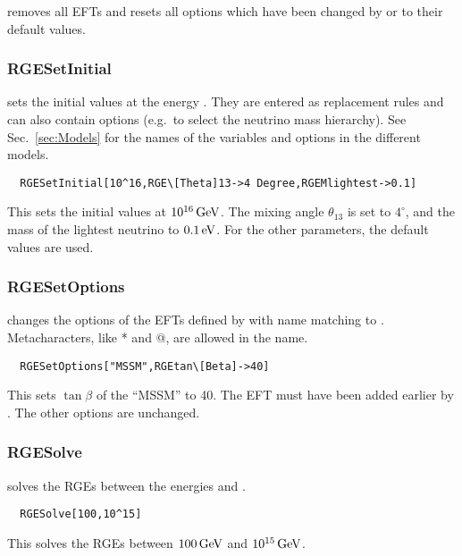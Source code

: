 \documentclass[10pt,a4paper,twoside]{scrartcl}
\begin{document}
 removes all EFTs and resets all options which have
been changed by  or 
to their default values. 

\subsubsection{RGESetInitial}

 sets
the initial values at the energy .  They are entered as
replacement rules and can also contain options (e.g.\ to select the
neutrino mass hierarchy).  See Sec.~\ref{sec:Models} for the names of
the variables and options in the different models.

\begin{verbatim}
  RGESetInitial[10^16,RGE\[Theta]13->4 Degree,RGEMlightest->0.1]
\end{verbatim}
This sets the initial values at $10^{16}\,\mathrm{GeV}$.  The mixing angle
$\theta_{13}$ is set to $4^\circ$, and the mass of the lightest neutrino
to $0.1\,\mathrm{eV}$.  For the other parameters, the default values are used.



\subsubsection{RGESetOptions}

 changes the options
of the EFTs defined by  with name matching  to . Metacharacters, like * and @, are
allowed in the name.

\begin{verbatim}
  RGESetOptions["MSSM",RGEtan\[Beta]->40]
\end{verbatim}
This sets $\tan\beta$ of the ``MSSM'' to 40.  The EFT must have been
added earlier by .  The other options are
unchanged.



\subsubsection{RGESolve}

 solves
the RGEs between the energies  and . 

\begin{verbatim}
  RGESolve[100,10^15]
\end{verbatim}
This solves the RGEs between $100\,\mathrm{GeV}$ and $10^{15}\,\mathrm{GeV}$.
\end{document}

